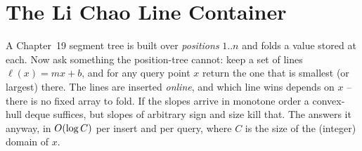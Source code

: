 \section{The Li Chao Line Container}\label{sec:c29-lichao}

\begin{previouslybox}
A Chapter~19 segment tree is built over \emph{positions} \(1..n\) and folds a
value stored at each.  Now ask something the position-tree cannot: keep a set of
lines \(\ell(x)=mx+b\), and for any query point \(x\) return the one that is
smallest (or largest) there.  The lines are inserted \emph{online}, and which
line wins depends on \(x\) -- there is no fixed array to fold.  If the slopes
arrive in monotone order a convex-hull deque suffices, but slopes of arbitrary
sign and size kill that.  The  answers it anyway,
in \(O(\log C)\) per insert and per query, where \(C\) is the size of the
(integer) domain of \(x\).
\end{previouslybox}

